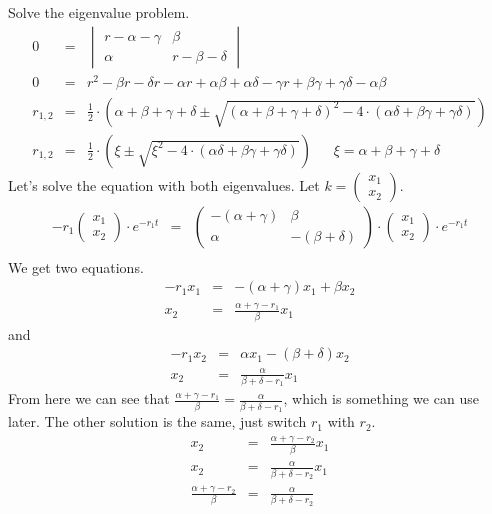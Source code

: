 \documentclass[10pt, a4paper]{article}
\begin{document}
Solve the eigenvalue problem.
\begin{eqnarray*}
0 &=& \begin{vmatrix}
r -\alpha - \gamma & \beta \\
\alpha & r - \beta - \delta 
\end{vmatrix} \\
0 &=& r^2 - \beta r - \delta r - \alpha r + \alpha \beta + \alpha \delta -\gamma r + \beta \gamma + \gamma \delta - \alpha \beta \\
r_{1,2} &=& \frac{1}{2} \cdot \left( \alpha + \beta + \gamma + \delta \pm \sqrt{(\alpha + \beta +  \gamma + \delta)^2 - 4 \cdot(\alpha \delta +  \beta \gamma + \gamma \delta)} \right)\\
r_{1,2} &=& \frac{1}{2} \cdot \left( \xi \pm \sqrt{\xi^2 - 4 \cdot(\alpha \delta +  \beta \gamma + \gamma \delta)} \right)  \:\:\:\:\:\:\: \xi = \alpha + \beta + \gamma + \delta
\end{eqnarray*}
Let's solve the equation with both eigenvalues. Let $k = \begin{pmatrix} x_1 \\ x_2  \end{pmatrix}$. 
\begin{eqnarray*}
-r_1 \begin{pmatrix} x_1 \\ x_2  \end{pmatrix} \cdot e^{-r_1t} &=& 
\begin{pmatrix}
-(\alpha + \gamma) & \beta \\
\alpha & -(\beta + \delta) 
\end{pmatrix} 
\cdot \begin{pmatrix} x_1 \\ x_2  \end{pmatrix} \cdot e^{-r_1t} \\
\end{eqnarray*}
We get two equations. 
\begin{eqnarray*}
-r_1 x_1 &=& -(\alpha + \gamma)x_1 + \beta x_2  \\
x_2 &=& \frac{\alpha + \gamma - r_1}{\beta}x_1
\end{eqnarray*}
and 
\begin{eqnarray*}
-r_1 x_2 &=& \alpha x_1 -(\beta + \delta)x_2 \\
x_2 &=& \frac{\alpha}{\beta + \delta - r_1}x_1 
\end{eqnarray*}
From here we can see that $  \frac{\alpha + \gamma - r_1}{\beta} = \frac{\alpha}{\beta + \delta - r_1}$, which is something we can use later. 
The other solution is the same, just switch $r_1$ with $r_2$. 
\begin{eqnarray*}
x_2 &=& \frac{\alpha + \gamma - r_2}{\beta}x_1 \\
x_2 &=& \frac{\alpha}{\beta + \delta - r_2}x_1 \\
\frac{\alpha + \gamma - r_2}{\beta} &=& \frac{\alpha}{\beta + \delta - r_2}
\end{eqnarray*}
\end{document}
